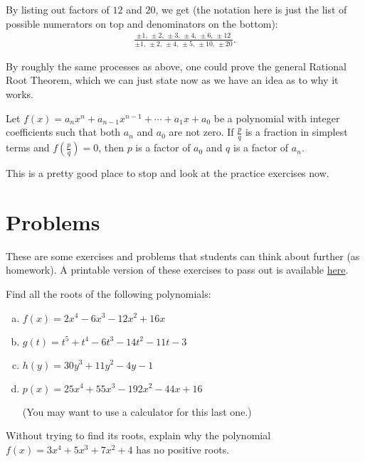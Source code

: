 By listing out factors of $12$ and $20$, we get (the notation here is just the list of possible numerators on top and denominators on the bottom):
\begin{align*}
    \frac{\pm 1,\, \pm 2,\, \pm 3,\, \pm 4,\, \pm 6,\, \pm 12}{\pm 1,\, \pm 2,\, \pm 4,\, \pm 5,\, \pm 10,\, \pm 20}.
\end{align*}

By roughly the same processes as above, one could prove the general Rational Root Theorem, which we can just state now as we have an idea as to why it works.
\begin{theorem}
    Let $f(x) = a_n x^n + a_{n-1} x^{n-1} + \cdots + a_1 x + a_0$ be a polynomial with integer coefficients such that both $a_n$ and $a_0$ are not zero. If $\frac{p}{q}$ is a fraction in simplest terms and $f\left(\frac{p}{q}\right) = 0$, then $p$ is a factor of $a_0$ and $q$ is a factor of $a_n$.
\end{theorem}

This is a pretty good place to stop and look at the practice exercises now.

\newpage



\section{Problems}

These are some exercises and problems that students can think about further (as homework). A printable version of these exercises to pass out is available \href{https://github.com/KlebbtheKlari/EPSY-201-Lesson-Plans/blob/main/extra/9pset.pdf}{here}.

\begin{exercise}
    Find all the roots of the following polynomials:
    \begin{enumerate}[(a)]
        \item $f(x) = 2x^4-6x^3-12x^2+16x$
        \item $g(t) = t^5+t^4-6t^3-14t^2-11t-3$
        \item $h(y) = 30y^3+11y^2-4y-1$
        \item $p(x) = 25x^4+55x^3-192x^2-44x+16$ 
        
        (You may want to use a calculator for this last one.)
    \end{enumerate}
\end{exercise}

\begin{exercise}
    Without trying to find its roots, explain why the polynomial $f(x) = 3x^4 + 5x^3 + 7x^2 + 4$ has no positive roots.
\end{exercise}

